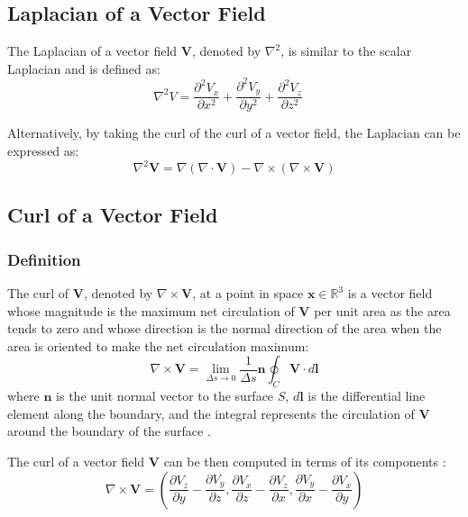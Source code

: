 \subsection{Laplacian of a Vector Field}
The Laplacian of a vector field $\mathbf{V}$, denoted by $\nabla^2$, is similar 
to the scalar Laplacian and is defined as:
\begin{equation}
\nabla^2 V = \frac{\partial^2 V_x}{\partial x^2} + \frac{\partial^2 V_y}{\partial 
y^2} + \frac{\partial^2 V_z}{\partial z^2} \quad
\end{equation}

Alternatively, by taking the curl of the curl of a vector field, the Laplacian 
can be expressed as:
\begin{equation}
   \nabla^2 \mathbf{V} = \nabla (\nabla \cdot \mathbf{V}) - \nabla \times 
   (\nabla \times \mathbf{V})
   \label{eq:laplacian}
\end{equation}

\subsection{Curl of a Vector Field}
\subsubsection{Definition}
The curl of \(\mathbf{V}\), denoted by \(\nabla \times \mathbf{V}\), at a point in 
space \(\mathbf{x} \in \mathbb{R}^3\) is a vector field whose magnitude is the 
maximum net circulation of \(\mathbf{V}\) per unit area as the area tends to zero 
and whose direction is the normal direction of the area when the area is oriented 
to make the net circulation maximum:
\begin{equation}
\nabla \times \mathbf{V} = \lim_{\Delta s \to 0} \frac{1}{\Delta s} \mathbf{n} 
\oint_{C} \mathbf{V} \cdot d\mathbf{l}
\label{eq:curl}
\end{equation}
where \(\mathbf{n}\) is the unit normal vector to the surface \(S\), \(d\mathbf{l}\) 
is the differential line element along the boundary, and the integral represents 
the circulation of \(\mathbf{V}\) around the boundary of the surface 
\cite{book-magnetism}.

The curl of a vector field \(\mathbf{V}\) can be then computed in terms of its 
components \cite{math-book}:
\begin{equation}
\nabla \times \mathbf{V} = \left( \frac{\partial V_z}{\partial y} - \frac{\partial 
V_y}{\partial z}, \frac{\partial V_x}{\partial z} - \frac{\partial V_z}{\partial 
x}, \frac{\partial V_y}{\partial x} - \frac{\partial V_x}{\partial y} \right)
\label{eq:curl_calculation}
\end{equation}

